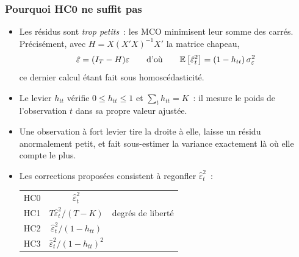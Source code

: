 \documentclass[10pt]{beamer}
\begin{document}
\begin{frame}
  \frametitle{Pourquoi HC0 ne suffit pas}

  \begin{itemize}

  \item Les résidus sont \emph{trop petits}~: les MCO minimisent leur somme des
    carrés. Précisément, avec $H = X(X'X)^{-1}X'$ la matrice chapeau,
    \[
      \hat\varepsilon = (I_T - H)\varepsilon
      \qquad\text{d'où}\qquad
      \mathbb E\left[\hat\varepsilon_t^2\right] = (1-h_{tt})\,\sigma_{\varepsilon}^2
    \]
    ce dernier calcul étant fait sous homoscédasticité.

  \item Le levier $h_{tt}$ vérifie $0\leq h_{tt}\leq 1$ et
    $\sum_t h_{tt} = K$~: il mesure le poids de l'observation $t$ dans sa propre
    valeur ajustée.\newline

  \item[$\Rightarrow$] Une observation à fort levier tire la droite à elle,
    laisse un résidu anormalement petit, et fait sous-estimer la variance
    exactement là où elle compte le plus.\newline

  \item Les corrections proposées consistent à regonfler $\hat\varepsilon_t^2$~:

    \begin{center}
      \renewcommand{\arraystretch}{1.3}
      \begin{tabular}{lcl}
        \toprule
        HC0 & $\hat\varepsilon_t^2$ & \cite{White1980}\\
        HC1 & $T\hat\varepsilon_t^2/(T-K)$ & degrés de liberté\\
        HC2 & $\hat\varepsilon_t^2/(1-h_{tt})$ & \cite{MacKinnonWhite1985}\\
        HC3 & $\hat\varepsilon_t^2/(1-h_{tt})^2$ & \cite{DavidsonMacKinnon1993}\\
        \bottomrule
      \end{tabular}
    \end{center}

  \end{itemize}

\end{frame}
\end{document}
